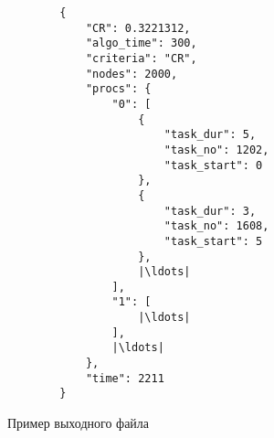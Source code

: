 \begin{listing}[!htbp]
    \begin{verbatim}
        {  
            "CR": 0.3221312,  
            "algo_time": 300, 
            "criteria": "CR", 
            "nodes": 2000, 
            "procs": { 
                "0": [ 
                    { 
                        "task_dur": 5, 
                        "task_no": 1202, 
                        "task_start": 0 
                    }, 
                    { 
                        "task_dur": 3, 
                        "task_no": 1608, 
                        "task_start": 5 
                    },
                    |\ldots|
                ], 
                "1": [ 
                    |\ldots|
                ], 
                |\ldots|
            }, 
            "time": 2211 
        }
    \end{verbatim}
    \caption{Пример выходного файла}
    \label{lst:output-file}
\end{listing}

